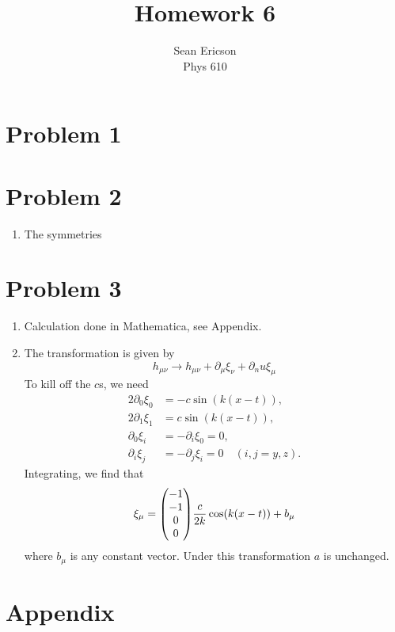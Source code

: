 \documentclass[12pt]{article}
\begin{document}
\title{Homework 6}
\author{Sean Ericson \\ Phys 610}
\maketitle

\section*{Problem 1}



\section*{Problem 2}
\begin{enumerate}[label=(\alph*)]
    \item The symmetries 
\end{enumerate}


\section*{Problem 3}
\begin{enumerate}[label=(\alph*)]
    \item Calculation done in Mathematica, see Appendix.
    \item The transformation is given by 
    \[ h_{\mu\nu} \to h_{\mu\nu} + \partial_{\mu}\xi_\nu + \partial_nu\xi_\mu \]
    To kill off the $c$s, we need 
    \begin{align*}
        2\partial_0\xi_0 &= -c\sin(k(x-t)), \\
        2\partial_1\xi_1 &= c\sin(k(x-t)), \\
        \partial_0\xi_i &= -\partial_i\xi_0 = 0, \\
        \partial_i\xi_j &= -\partial_j\xi_i = 0 \quad (i,j = y,z).
    \end{align*}
    Integrating, we find that
    \[ \xi_\mu = \mqty(-1\\-1\\0\\0)\frac{c}{2k}\cos(k(x-t)) + b_\mu \]
    where $b_\mu$ is any constant vector. Under this transformation $a$ is unchanged.
\end{enumerate}

\section*{Appendix}

\end{document}
